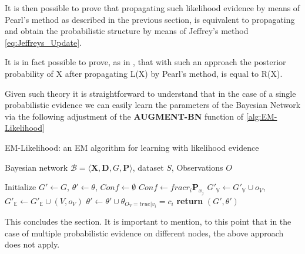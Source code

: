 \documentclass[11pt]{article}
\begin{document}
It is then possible to prove that propagating such likelihood
evidence by means of Pearl's method as described in the previous
section, is equivalent to propagating and obtain the probabilistic
structure by means of Jeffrey's method \ref{eq:Jeffreys_Update}.

It is in fact possible to prove, as in \cite{PENG_2010}, that with
such an approach the posterior probability of X after propagating
L(X) by Pearl’s method, is equal to R(X).

Given such theory it is straightforward to understand that
in the case of a single probabilistic evidence we can easily learn
the parameters of the Bayesian Network via the following adjustment
of the \textbf{AUGMENT-BN} function of \ref{alg:EM-Likelihood}

\algrenewcommand\algorithmicindent{1.5em}%

\begin{algorithm*}[h!]
\caption{EM-Likelihood: an EM algorithm for learning with likelihood evidence}
\label{alg:EM-Likelihood}
\vspace{-10pt}
\begin{multicols}{2}
\begin{algorithmic}[1] 
\Require Bayesian network $\mathcal{B}=\langle \mathbf{X},\mathbf{D}, G, \mathbf{P} \rangle$, dataset $S$, Observations $O$

  \State Initialize $G'\leftarrow G$, $\theta'\leftarrow\theta$, $Conf \leftarrow \emptyset$
    
    $Conf \leftarrow frac{r_i}{\mathbf{P}_{x_j}}$ 
  \EndFor
    \State $G'_{\mathbb{V}}\leftarrow G'_{\mathbb{V}}\cup o_{V}$, $G'_{\mathbb{E}}\leftarrow G'_{\mathbb{E}}\cup(V,o_{V})$      
       
      \State $\theta'\leftarrow\theta'\cup\theta_{O_{V}=true|v_{i}}=c_{i}$ 
    \EndFor
  \EndFor
\State \textbf{return} $(G',\theta')$
\end{algorithmic}
\end{multicols}
\end{algorithm*}

This concludes the section. It is important to mention, to this
point that in the case of multiple probabilistic evidence on
different nodes, the above approach does not apply.
\end{document}
